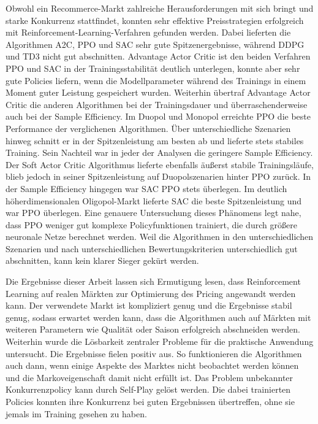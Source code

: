 Obwohl ein Recommerce-Markt zahlreiche Herausforderungen mit sich bringt und starke Konkurrenz stattfindet, konnten sehr effektive Preisstrategien erfolgreich mit Reinforcement-Learning-Verfahren gefunden werden.
Dabei lieferten die Algorithmen A2C, PPO und SAC sehr gute Spitzenergebnisse, während DDPG und TD3 nicht gut abschnitten.
Advantage Actor Critic ist den beiden Verfahren PPO und SAC in der Trainingsstabilität deutlich unterlegen, konnte aber sehr gute Policies liefern, wenn die Modellparameter während des Trainings in einem Moment guter Leistung gespeichert wurden.
Weiterhin übertraf Advantage Actor Critic die anderen Algorithmen bei der Trainingsdauer und überraschenderweise auch bei der Sample Efficiency.
Im Duopol und Monopol erreichte PPO die beste Performance der verglichenen Algorithmen.
Über unterschiedliche Szenarien hinweg schnitt er in der Spitzenleistung am besten ab und lieferte stets stabiles Training.
Sein Nachteil war in jeder der Analysen die geringere Sample Efficiency.
Der Soft Actor Critic Algorithmus lieferte ebenfalls äußerst stabile Trainingsläufe, blieb jedoch in seiner Spitzenleistung auf Duopolszenarien hinter PPO zurück.
In der Sample Efficiency hingegen war SAC PPO stets überlegen.
Im deutlich höherdimensionalen Oligopol-Markt lieferte SAC die beste Spitzenleistung und war PPO überlegen.
Eine genauere Untersuchung dieses Phänomens legt nahe, dass PPO weniger gut komplexe Policyfunktionen trainiert, die durch größere neuronale Netze berechnet werden.
Weil die Algorithmen in den unterschiedlichen Szenarien und nach unterschiedlichen Bewertungskriterien unterschiedlich gut abschnitten, kann kein klarer Sieger gekürt werden.

Die Ergebnisse dieser Arbeit lassen sich Ermutigung lesen, dass Reinforcement Learning auf realen Märkten zur Optimierung des Pricing angewandt werden kann.
Der verwendete Markt ist kompliziert genug und die Ergebnisse stabil genug, sodass erwartet werden kann, dass die Algorithmen auch auf Märkten mit weiteren Parametern wie Qualität oder Saison erfolgreich abschneiden werden.
Weiterhin wurde die Lösbarkeit zentraler Probleme für die praktische Anwendung untersucht.
Die Ergebnisse fielen positiv aus.
So funktionieren die Algorithmen auch dann, wenn einige Aspekte des Marktes nicht beobachtet werden können und die Markoveigenschaft damit nicht erfüllt ist.
Das Problem unbekannter Konkurrenzpolicy kann durch Self-Play gelöst werden.
Die dabei trainierten Policies konnten ihre Konkurrenz bei guten Ergebnissen übertreffen, ohne sie jemals im Training gesehen zu haben.

